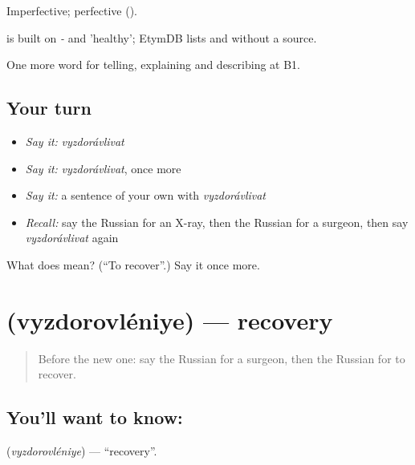 Imperfective; perfective  ().

\begin{cousinweb}
\emph{} is built on \emph{-} and \emph{} 'healthy'; EtymDB lists \emph{} and \emph{} without a source.
\end{cousinweb}

\begin{grammarlens}[title={What you've built}]
One more word for telling, explaining and describing at B1.
\end{grammarlens}

\subsection*{Your turn}
\begin{itemize}
\raggedright
  \item \emph{Say it:} \emph{vyzdorávlivat}
  \item \emph{Say it:} \emph{vyzdorávlivat}, once more
  \item \emph{Say it:} a sentence of your own with \emph{vyzdorávlivat}
  \item \emph{Recall:} say the Russian for an X-ray, then the Russian for a surgeon, then say \emph{vyzdorávlivat} again
\end{itemize}

\begin{tcolorbox}[breakable,colback=teal!4,colframe=teal!35!black,title={Before you move on}]
What does  mean? (\textquotedblleft{}To recover\textquotedblright{}.) Say it once more.
\end{tcolorbox}
\section[\texorpdfstring{\ru{выздоровление} (vyzdorovléniye)}{выздоровление (vyzdorovléniye)}]{ (vyzdorovléniye) — recovery}

\label{lesson:RU-C490-vyzdorovleniye}



\begin{quote}
Before the new one: say the Russian for a surgeon, then the Russian for to recover.
\end{quote}

\subsection*{You'll want to know: }
\textbf{} (\emph{vyzdorovléniye}) — \textquotedblleft{}recovery\textquotedblright{}.

